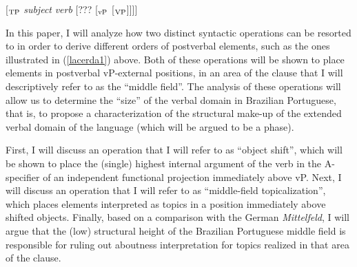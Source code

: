 \documentclass[output=paper]{langscibook}
\begin{document}
\begin{exe}
\ex \label{lacerda2}
[$_{\textnormal{TP}}$ \emph{subject} \emph{verb} [\hspace{0.5mm}??? [$_{\textnormal{vP}}$ [$_{\textnormal{VP}}$\hspace{0.5mm}]\hspace{0.5mm}]\hspace{0.5mm}]\hspace{0.5mm}]
\end{exe}

In this paper, I will analyze how two distinct syntactic operations can be resorted to in order to derive different orders of postverbal elements, such as the ones illustrated in (\ref{lacerda1}) above. Both of these operations will be shown to place elements in postverbal vP-external positions, in an area of the clause that I will descriptively refer to as the “middle field”. The analysis of these operations will allow us to determine the “size” of the verbal domain in Brazilian Portuguese, that is, to propose a characterization of the structural make-up of the extended verbal domain of the language (which will be argued to be a phase).

First, I will discuss an operation that I will refer to as “object shift”, which will be shown to place the (single) highest internal argument of the verb in the A-specifier of an independent functional projection immediately above vP. Next, I will discuss an operation that I will refer to as “middle-field topicalization”, which places elements interpreted as topics in a position immediately above shifted objects. Finally, based on a comparison with the German \emph{Mittelfeld}, I will argue that the (low) structural height of the Brazilian Portuguese middle field is responsible for ruling out aboutness interpretation for topics realized in that area of the clause.

\largerpage[2]
\end{document}
